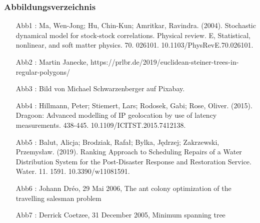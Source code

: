 \begin{frame}



\frametitle{Abbildungsverzeichnis}
 {
	\begin{itemize}
		\item 	[Abb1]: Ma, Wen-Jong; Hu, Chin-Kun; Amritkar, Ravindra. (2004). Stochastic dynamical model for stock-stock correlations. Physical review. E, Statistical, nonlinear, and soft matter physics. 70. 026101. 10.1103/PhysRevE.70.026101. 
		\item 	[Abb2]: Martin Janecke, https://prlbr.de/2019/euclidean-steiner-trees-in-regular-polygons/
		\item 	[Abb3]: Bild von Michael Schwarzenberger auf Pixabay.
		\item 	[Abb4]: Hillmann, Peter; Stiemert, Lars; Rodosek, Gabi; Rose, Oliver. (2015). Dragoon: Advanced modelling of IP geolocation by use of latency measurements. 438-445. 10.1109/ICITST.2015.7412138. 
		\item 	[Abb5]: Balut, Alicja; Brodziak, Rafał; Bylka, Jędrzej; Zakrzewski, Przemysław. (2019). Ranking Approach to Scheduling Repairs of a Water Distribution System for the Post-Disaster Response and Restoration Service. Water. 11. 1591. 10.3390/w11081591. 
	\end{itemize}
}
 {
	\begin{itemize}
		\item 	[Abb6]: Johann Dréo, 29 Mai 2006, The ant colony optimization of the travelling salesman problem	
		\item 	[Abb7]: Derrick Coetzee, 31 December 2005, Minimum spanning tree
	\end{itemize}
}



\end{frame}
